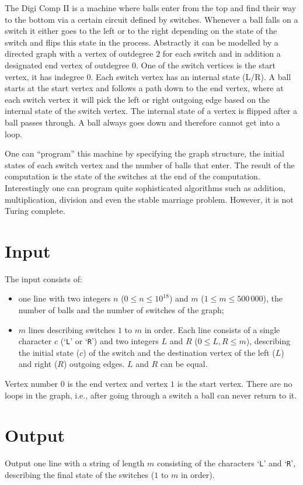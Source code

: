 
%
\noindent
The Digi Comp II is a machine where balls enter from the
top and find their way to the bottom via a certain circuit defined by
switches.  
Whenever a ball falls on a switch it either goes to the left or to the
right depending on the state of the switch and flips this
state in the process.
Abstractly it can be modelled by a directed graph with a vertex of
outdegree $2$ for each switch and in addition a designated end vertex
of outdegree $0$.  One of the switch vertices is the start vertex, it
has indegree $0$.  Each switch vertex has an internal state (L/R). A
ball starts at the start vertex and follows
a path down to the end vertex, where at each switch vertex it will
pick the left or right outgoing edge based on the internal state of
the switch vertex. The internal state of a vertex is flipped after a ball passes through.
A ball always goes down and therefore cannot get into a loop. 

One can ``program'' this machine by specifying the graph structure, the
initial states of each switch vertex and the number of balls that enter. The result 
of the computation is the state of the switches at the end of the
computation. Interestingly one can program quite sophisticated
algorithms such as addition, multiplication, 
division and even the stable marriage problem. However, it is not
Turing complete. 

\section*{Input}

The input consists of:
\begin{itemize}
\item one line with two integers $n$ ($0\le n\le10^{18}$) and
  $m$ ($1\le m\le 500\,000$), the number of balls and the number of switches of the graph;
\item $m$ lines describing switches $1$ to $m$ in order. Each line
  consists of a single character $c$ (`\texttt{L}' or `\texttt{R}')
  and two integers $L$ and $R$ ($0\le L,R\le m$), describing the
  initial state ($c$) of the switch 
and the destination vertex of the left ($L$) and right ($R$) outgoing
edges. $L$ and $R$ can be equal.
\end{itemize}
Vertex number $0$ is the end vertex and vertex $1$ is the
start vertex. There are no loops in the graph, i.e., after going
through a switch a ball can never return to it.

\section*{Output}

Output one line with a string of length $m$ consisting of the characters `\texttt{L}' and `\texttt{R}', describing the final state of the switches ($1$ to $m$ in order). 
